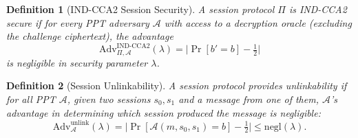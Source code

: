 \documentclass[11pt,a4paper]{article}
\newtheorem{definition}{Definition}[section]
\begin{document}
\begin{definition}[IND-CCA2 Session Security]
    A session protocol $\Pi$ is IND-CCA2 secure if for every PPT adversary
    $\mathcal{A}$ with access to a decryption oracle (excluding the
    challenge ciphertext), the advantage
    \[
        \mathrm{Adv}^{\mathrm{IND\text{-}CCA2}}_{\Pi,\mathcal{A}}(\lambda)
        = \bigl| \Pr[b' = b] - \tfrac{1}{2} \bigr|
    \]
    is negligible in security parameter $\lambda$.
\end{definition}

\begin{definition}[Session Unlinkability]
    A session protocol provides unlinkability if for all PPT
    $\mathcal{A}$, given two sessions $s_0, s_1$ and a message from one of
    them, $\mathcal{A}$'s advantage in determining which session produced
    the message is negligible:
    \[
        \mathrm{Adv}^{\mathrm{unlink}}_{\mathcal{A}}(\lambda)
        = \bigl| \Pr[\mathcal{A}(m, s_0, s_1) = b] - \tfrac{1}{2} \bigr|
        \leq \mathrm{negl}(\lambda).
    \]
\end{definition}
\end{document}

